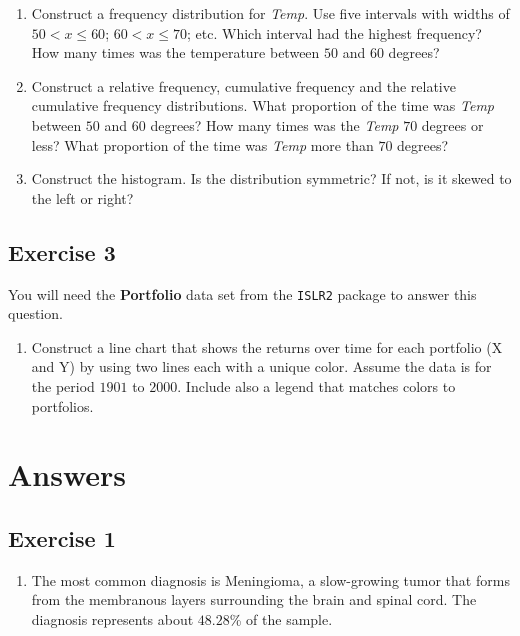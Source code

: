 \documentclass[
  letterpaper,
  DIV=11,
  numbers=noendperiod]{scrreprt}
\providecommand{\tightlist}{%
  \setlength{\itemsep}{0pt}\setlength{\parskip}{0pt}}\usepackage{longtable,booktabs,array}
\begin{document}
\begin{enumerate}
\def\labelenumi{\arabic{enumi}.}
\tightlist
\item
  Construct a frequency distribution for \emph{Temp}. Use five intervals
  with widths of \(50<x\le60\); \(60<x\le70\); etc. Which interval had
  the highest frequency? How many times was the temperature between
  \(50\) and \(60\) degrees?
\item
  Construct a relative frequency, cumulative frequency and the relative
  cumulative frequency distributions. What proportion of the time was
  \emph{Temp} between \(50\) and \(60\) degrees? How many times was the
  \emph{Temp} \(70\) degrees or less? What proportion of the time was
  \emph{Temp} more than \(70\) degrees?
\item
  Construct the histogram. Is the distribution symmetric? If not, is it
  skewed to the left or right?
\end{enumerate}

\hypertarget{exercise-3-2}{%
\subsection*{Exercise 3}\label{exercise-3-2}}

You will need the \textbf{Portfolio} data set from the \texttt{ISLR2}
package to answer this question.

\begin{enumerate}
\def\labelenumi{\arabic{enumi}.}
\tightlist
\item
  Construct a line chart that shows the returns over time for each
  portfolio (X and Y) by using two lines each with a unique color.
  Assume the data is for the period \(1901\) to \(2000\). Include also a
  legend that matches colors to portfolios.
\end{enumerate}

\hypertarget{answers-1}{%
\section{Answers}\label{answers-1}}

\hypertarget{exercise-1-3}{%
\subsection*{Exercise 1}\label{exercise-1-3}}

\begin{blackbox}

\begin{enumerate}
\def\labelenumi{\arabic{enumi}.}
\tightlist
\item
  The most common diagnosis is Meningioma, a slow-growing tumor that
  forms from the membranous layers surrounding the brain and spinal
  cord. The diagnosis represents about \(48.28\)\% of the sample.
\end{enumerate}

\end{blackbox}
\end{document}
